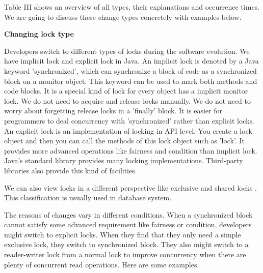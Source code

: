 \documentclass[conference]{IEEEtran}
\begin{document}
Table III shows an overview of all types, their explanations and occurrence times. We are going to discuss these change types concretely with examples below.


\textbf{Changing lock type}

Developers switch to different types of locks during the software evolution. We have implicit lock and explicit lock in Java. An implicit lock is denoted by a Java keyword 'synchronized', which can synchronize a block of code as a synchronized block on a monitor object. This keyword can be used to mark both methods and code blocks. It is a special kind of lock for every object has a implicit monitor lock. We do not need to acquire and release locks manually. We do not need to worry about forgetting release locks in a 'finally' block. It is easier for programmers to deal concurrency with 'synchronized' rather than explicit locks. An explicit lock is an implementation of locking in API level. You create a lock object and then you can call the methods of this lock object such as 'lock'. It provides more advanced operations like fairness and condition than implicit lock. Java's standard library provides many locking implementations. Third-party libraries also provide this kind of facilities.

We can also view locks in a different perspective like exclusive and shared locks \cite{journals/jacm/KedemS83}. This classification is usually used in database system.


The reasons of changes vary in different conditions. When a synchronized block cannot satisfy some advanced requirement like fairness or condition, developers might switch to explicit locks. When they find that they only need a simple exclusive lock, they switch to synchronized block. They also might switch to a reader-writer lock \cite{journals/cacm/CouroisHP71} from a normal lock to improve concurrency when there are plenty of concurrent read operations. Here are some examples.
\end{document}
